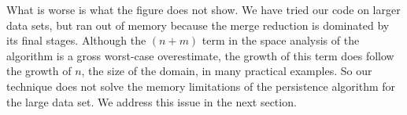 What is worse is what the figure does not show. We have tried our code on larger
data sets, but ran out of memory because the merge reduction is dominated by its
final stages. Although the $(n+m)$ term in the space analysis of the
 algorithm is a gross worst-case overestimate, the growth of this
term does follow the growth of $n$, the size of the domain, in many practical
examples. So our technique does not solve the memory limitations of the
persistence algorithm for the large data set. We address this issue in the next
section.


